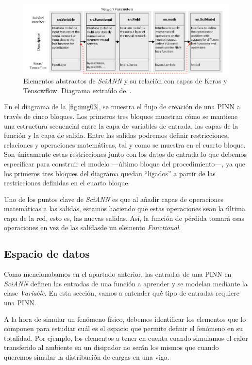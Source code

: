  \begin{figure}[h]
    \centering
    \includegraphics[width=1\textwidth]{img/img03.png}
    \caption{Elementos abstractos de \textit{SciANN} y su relación con capas de Keras y Tensowflow. Diagrama extraído de~\cite{Haghighat2021}.}
    \label{fig:img03}
\end{figure}

En el diagrama de la \autoref{fig:img03}, se muestra el flujo de creación de una PINN a través de cinco bloques. Los primeros tres bloques muestran cómo se mantiene una estructura secuencial entre la capa de variables de entrada, las capas de la función y la capa de salida. Entre las salidas podremos definir restricciones, relaciones y operaciones matemáticas, tal y como se muestra en el cuarto bloque. Son únicamente estas restricciones junto con los datos de entrada lo que debemos especificar para construir el modelo ---último bloque del procedimiento---, ya que los primeros tres bloques del diagrama quedan ``ligados'' a partir de las restricciones definidas en el cuarto bloque. 

Uno de los puntos clave de \textit{SciANN} es que al añadir capas de operaciones matemáticas a las salidas, estamos haciendo que estas operaciones sean la última capa de la red, esto es, las nuevas salidas. Así, la función de pérdida tomará esas operaciones en vez de las salidasde un elemento \textit{Functional}. 

\subsection{Espacio de datos}

Como mencionabamos en el apartado anterior, las entradas de una PINN en \textit{SciANN} definen las entradas de una función a aprender y se modelan mediante la clase \textit{Variable}. En esta sección, vamos a entender qué tipo de entradas requiere una PINN. 

A la hora de simular un fenómeno físico, debemos identificar los elementos que lo componen para estudiar cuál es el espacio que permite definir el fenómeno en su totalidad. Por ejemplo, los elementos a tener en cuenta cuando simulamos el calor transferido al ambiente en un disipador no serán los mismos que cuando queremos simular la distribución de cargas en una viga. 

